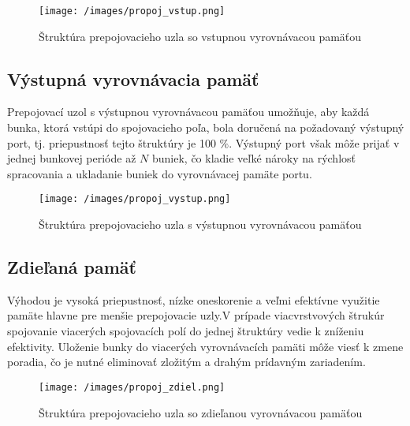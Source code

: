 \begin{figure}[ht]
\centering
  \begin{center}
    \texttt{[image: /images/propoj\_vstup.png]}
  \end{center}
  \caption[Štruktúra prepojovacieho uzla so vstupnou vyrovnávacou pamäťou]{Štruktúra prepojovacieho uzla so vstupnou vyrovnávacou pamäťou}
\end{figure}

\subsection{Výstupná vyrovnávacia pamäť}
Prepojovací uzol s výstupnou vyrovnávacou pamäťou umožňuje, aby každá bunka, ktorá vstúpi do spojovacieho poľa, bola doručená na požadovaný výstupný port, tj. priepustnosť tejto štruktúry je 100 $\%$. Výstupný port však môže prijať v jednej bunkovej perióde až $N$ buniek, čo kladie veľké nároky na rýchlosť spracovania a ukladanie buniek do vyrovnávacej pamäte portu.

\begin{figure}[ht]
\centering
  \begin{center}
    \texttt{[image: /images/propoj\_vystup.png]}
  \end{center}
  \caption[Štruktúra prepojovacieho uzla s výstupnou vyrovnávacou pamäťou]{Štruktúra prepojovacieho uzla s výstupnou vyrovnávacou pamäťou}
\end{figure}

\subsection{Zdieľaná pamäť}
Výhodou je vysoká priepustnosť, nízke oneskorenie a veľmi efektívne využitie pamäte hlavne pre menšie prepojovacie uzly.V prípade viacvrstvových štrukúr spojovanie viacerých spojovacích polí do jednej štruktúry vedie k zníženiu efektivity. Uloženie bunky do viacerých vyrovnávacích pamäti môže viesť k zmene poradia, čo je nutné eliminovať zložitým a drahým prídavným zariadením.

\begin{figure}[ht]
\centering
  \begin{center}
    \texttt{[image: /images/propoj\_zdiel.png]}
  \end{center}
  \caption[Štruktúra prepojovacieho uzla so zdieľanou vyrovnávacou pamäťou]{Štruktúra prepojovacieho uzla so zdieľanou vyrovnávacou pamäťou}
\end{figure}

